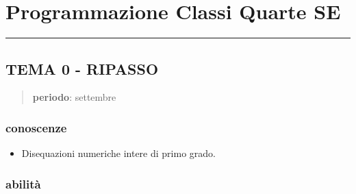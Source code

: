 \documentclass[12pt, a4paper]{exam}
\begin{document}




\newpage



\section*{\LARGE{Programmazione Classi Quarte SE}}
\vspace{2em}

\hrule
\bigskip
\subsection*{TEMA 0 - RIPASSO}

\begin{quote}
\textbf{periodo}: settembre
\end{quote}


\subsubsection*{conoscenze}

\begin{itemize}

\item
  Disequazioni numeriche intere di primo grado.
\end{itemize}


\subsubsection*{abilità}
\end{document}

